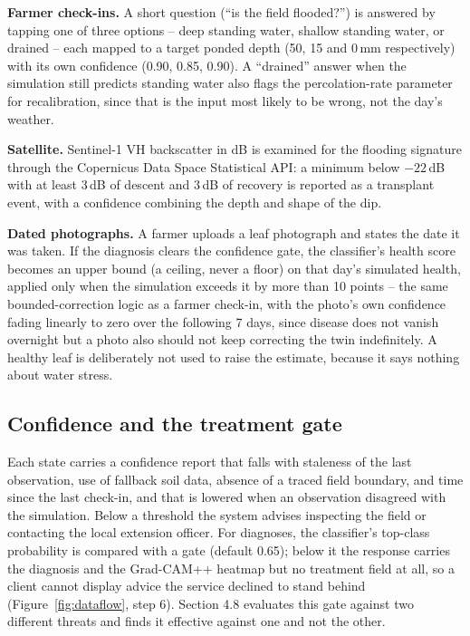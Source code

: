 \documentclass[11pt,a4paper]{article}
\begin{document}
\textbf{Farmer check-ins.} A short question (``is the field flooded?'') is answered by tapping one of three options -- deep standing water, shallow standing water, or drained -- each mapped to a target ponded depth (50, 15 and 0\,mm respectively) with its own confidence (0.90, 0.85, 0.90). A ``drained'' answer when the simulation still predicts standing water also flags the percolation-rate parameter for recalibration, since that is the input most likely to be wrong, not the day's weather.

\textbf{Satellite.} Sentinel-1 VH backscatter in dB is examined for the flooding signature through the Copernicus Data Space Statistical API: a minimum below $-22$\,dB with at least 3\,dB of descent and 3\,dB of recovery is reported as a transplant event, with a confidence combining the depth and shape of the dip.

\textbf{Dated photographs.} A farmer uploads a leaf photograph and states the date it was taken. If the diagnosis clears the confidence gate, the classifier's health score becomes an upper bound (a ceiling, never a floor) on that day's simulated health, applied only when the simulation exceeds it by more than 10 points -- the same bounded-correction logic as a farmer check-in, with the photo's own confidence fading linearly to zero over the following 7 days, since disease does not vanish overnight but a photo also should not keep correcting the twin indefinitely. A healthy leaf is deliberately not used to raise the estimate, because it says nothing about water stress.

\subsection{Confidence and the treatment gate}

Each state carries a confidence report that falls with staleness of the last observation, use of fallback soil data, absence of a traced field boundary, and time since the last check-in, and that is lowered when an observation disagreed with the simulation. Below a threshold the system advises inspecting the field or contacting the local extension officer. For diagnoses, the classifier's top-class probability is compared with a gate (default 0.65); below it the response carries the diagnosis and the Grad-CAM++ heatmap but no treatment field at all, so a client cannot display advice the service declined to stand behind (Figure~\ref{fig:dataflow}, step 6). Section 4.8 evaluates this gate against two different threats and finds it effective against one and not the other.
\end{document}
